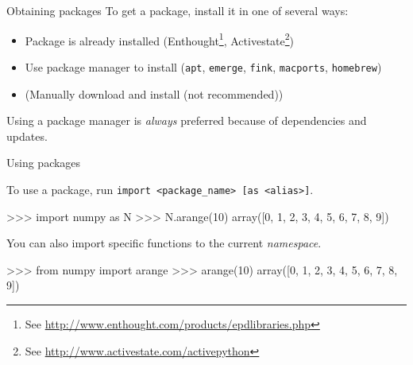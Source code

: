 \documentclass[xetex,10pt]{beamer}
\def\pythoni{\lstinline[language=pythontim]}
\def\spacer{\vspace*{1em}}
\begin{document}
\begin{frame}[fragile]{Obtaining packages}
	To get a package, install it in one of several ways:
	
	\spacer
	
	\begin{itemize}
		\item Package is already installed (Enthought\footnote[frame]{See \url{http://www.enthought.com/products/epdlibraries.php}}, Activestate\footnote[frame]{See \url{http://www.activestate.com/activepython}})
		\pause
		\item Use package manager to install (\texttt{apt}, \texttt{emerge}, \texttt{fink}, \texttt{macports}, \texttt{homebrew})
		\pause
		\item (Manually download and install (not recommended))
	\end{itemize}
	
	\spacer
	\pause
	
	Using a package manager is \emph{always} preferred because of dependencies and updates.
\end{frame}

\begin{frame}[fragile]{Using packages}
	
	To use a package, run \pythoni{import}\verb! <package_name> [as <alias>]!.
	\spacer
\begin{python}
>>> import numpy as N
>>> N.arange(10)
array([0, 1, 2, 3, 4, 5, 6, 7, 8, 9])
\end{python}
	\spacer
	\pause
	You can also import specific functions to the current \emph{namespace}.
	\spacer
\begin{python}
>>> from numpy import arange
>>> arange(10)
array([0, 1, 2, 3, 4, 5, 6, 7, 8, 9])
\end{python}

\end{frame}
\end{document}
